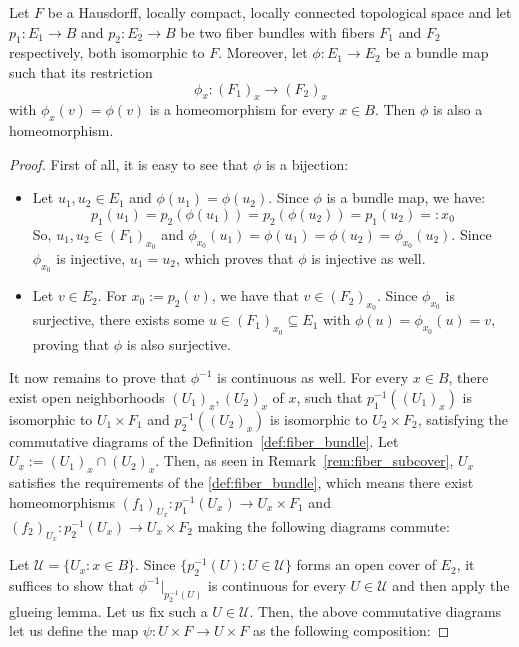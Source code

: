 \begin{theorem} Let $F$ be a Hausdorff, locally compact, locally connected topological space and let $p_1: E_1\to B$ and $p_2: E_2\to B$ be two fiber bundles with fibers $F_1$ and $F_2$ respectively, both isomorphic to $F$. Moreover, let $\phi:E_1\to E_2$ be a bundle map such that its restriction
\[\phi_x:(F_1)_x\to (F_2)_x\]
with $\phi_x(v)=\phi(v)$ is a homeomorphism for every $x\in B$. Then $\phi$ is also a homeomorphism.
\end{theorem}
\begin{proof} First of all, it is easy to see that $\phi$ is a bijection:
\begin{itemize}
\item Let $u_1,u_2\in E_1$ and $\phi(u_1)=\phi(u_2)$. Since $\phi$ is a bundle map, we have:
\[p_1(u_1)=p_2(\phi(u_1))=p_2(\phi(u_2))=p_1(u_2)=:x_0\]
So, $u_1,u_2\in\left(F_1\right)_{x_0}$ and $\phi_{x_0}(u_1)=\phi(u_1)=\phi(u_2)=\phi_{x_0}(u_2)$. Since $\phi_{x_0}$ is injective, $u_1=u_2$, which proves that $\phi$ is injective as well.
\item Let $v\in E_2$. For $x_0:=p_2(v)$, we have that $v\in\left(F_2\right)_{x_0}$. Since $\phi_{x_0}$ is surjective, there exists some $u\in\left(F_1\right)_{x_0}\subseteq E_1$ with $\phi(u)=\phi_{x_0}(u)=v$, proving that $\phi$ is also surjective.
\end{itemize}
It now remains to prove that $\phi^{-1}$ is continuous as well. For every $x\in B$, there exist open neighborhoods ${(U_1)}_x,{(U_2)}_x$ of $x$, such that $p_1^{-1}({(U_1)}_x)$ is isomorphic to $U_1\times F_1$ and $p_2^{-1}({(U_2)}_x)$ is isomorphic to $U_2\times F_2$, satisfying the commutative diagrams of the Definition~\ref{def:fiber_bundle}. Let $U_x:=(U_1)_x\cap(U_2)_x$. Then, as seen in Remark~\ref{rem:fiber_subcover}, $U_x$ satisfies the requirements of the \ref{def:fiber_bundle}, which means there exist homeomorphisms $(f_1)_{U_x}:p_1^{-1}(U_x)\to U_x\times F_1$ and $(f_2)_{U_x}:p_2^{-1}(U_x)\to U_x\times F_2$ making the following diagrams commute:
\begin{center}
\end{center}
Let $\mathcal{U}=\{U_x:x\in B\}$. Since $\{p_2^{-1}(U):U\in\mathcal{U}\}$ forms an open cover of $E_2$, it suffices to show that $\phi^{-1}|_{p_2^{-1}(U)}$ is continuous for every $U\in\mathcal{U}$ and then apply the glueing lemma. Let us fix such a $U\in\mathcal{U}$. Then, the above commutative diagrams let us define the map $\psi:U\times F\to U\times F$ as the following composition:

\end{proof}
